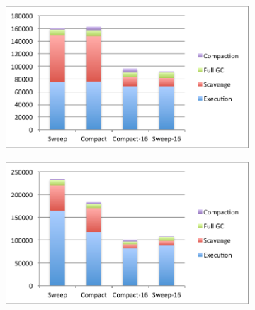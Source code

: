 \documentclass[10pt, sigplan]{acmart}
\begin{document}
\begin{figure}[thb]
	\centering
    	\begin{subfigure}[b]{.48\textwidth}
	\includegraphics[width=\linewidth]{figures/load} 
   	\end{subfigure} \hspace{0.03\textwidth} \begin{subfigure}[b]{.48\textwidth}
	\includegraphics[width=\linewidth]{figures/prop} 
   	\end{subfigure}
	

\end{figure}
\end{document}
